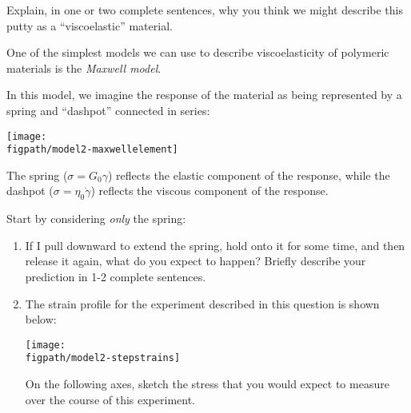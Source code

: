 \begin{activity}
\begin{ctqs}
			\begin{solution}[1.5in]
			\end{solution}
		
		\question Explain, in one or two complete sentences, why you think we might describe this putty as a ``viscoelastic'' material.
	
			\begin{solution}[1.5in]
			\end{solution}
	
		
\end{ctqs}
	

\begin{model}

	One of the simplest models we can use to describe viscoelasticity of polymeric materials is the \emph{Maxwell model}.
	
	In this model, we imagine the response of the material as being represented by a spring and ``dashpot'' connected in series:
	
	\centerline{\texttt{[image: \\figpath/model2-maxwellelement]}}
	
	The spring ($\sigma = G_0\gamma$) reflects the elastic component of the response, while the dashpot ($\sigma = \eta_0\dot\gamma$) reflects the viscous component of the response.

\end{model}

\begin{ctqs}
		\question Start by considering \emph{only} the spring:
		
			\begin{enumerate}
				\item If I pull downward to extend the spring, hold onto it for some time, and then release it again, what do you expect to happen?  Briefly describe your prediction in 1-2 complete sentences.
	
					\begin{solution}[1.5in]
					\end{solution}
				
				\item The strain profile for the experiment described in this question is shown below:
				
					\centerline{\texttt{[image: \\figpath/model2-stepstrains]}}
				
					On the following axes, sketch the stress that you would expect to measure over the course of this experiment.
				

\end{enumerate}
\end{ctqs}
\end{activity}
